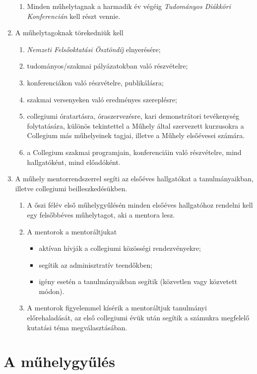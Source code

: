 \documentclass{../styles/rulebook}
\begin{document}
\begin{enumerate}
\begin{enumerate}
		\item Minden műhelytagnak a harmadik év végéig \emph{Tudományos Diákköri Konferencián} kell részt vennie.
	\end{enumerate}
\item A műhelytagoknak törekedniük kell
	\begin{enumerate}
		\item \emph{Nemzeti Felsőoktatási Ösztöndíj} elnyerésére;
		\item tudományos/szakmai pályázatokban való részvételre;
		\item konferenciákon való részvételre, publikálásra;
		\item szakmai versenyeken való eredményes szereplésre;
		\item collegiumi óratartásra, óraszervezésre, kari demonstrátori tevékenység folytatására, különös tekintettel a Műhely által szervezett kurzusokra a Collegium más műhelyeinek tagjai, illetve a Műhely elsőévesei számára.
		\item a Collegium szakmai programjain, konferenciáin való részvételre, mind hallgatóként, mind előadóként.
	\end{enumerate}
\item A műhely mentorrendszerrel segíti az elsőéves hallgatókat a tanulmányaikban, illetve collegiumi beilleszkedésükben.
	\begin{enumerate}
		\item A őszi félév első műhelygyűlésén minden elsőéves hallgatóhoz rendelni kell egy felsőbbéves műhelytagot, aki a mentora lesz.
		\item A mentorok a mentoráltjukat
			\begin{itemize} 
				\item aktívan hívják a collegiumi közösségi rendezvényekre;
				\item segítik az adminisztratív teendőkben;
				\item igény esetén a tanulmányaikban segítik (közvetlen vagy közvetett módon).
			\end{itemize}
		\item A mentorok figyelemmel kísérik a mentoráltjuk tanulmányi előrehaladását, az első collegiumi évük után segítik a számukra megfelelő kutatási téma megválasztásában.
	\end{enumerate}
\end{enumerate}

\section{A műhelygyűlés}
\end{document}
